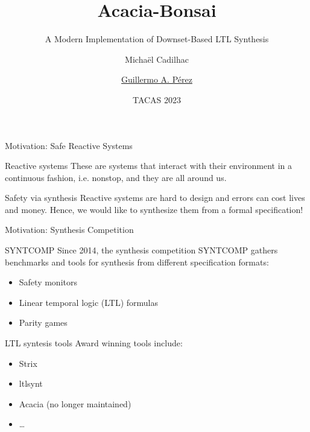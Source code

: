 \documentclass[aspectratio=169]{beamer}
\title{Acacia-Bonsai}
\subtitle{A Modern Implementation of Downset-Based LTL Synthesis}
\author{Micha\"el Cadilhac \and \underline{Guillermo A. P\'erez}}
\date{TACAS 2023}
\begin{document}
\begin{frame}
	\titlepage
\end{frame}

\begin{frame}{Motivation: Safe Reactive Systems}
  \begin{block}{Reactive systems}
    These are systems that interact with their environment in a
    \alert{continuous} fashion, i.e. nonstop, and they are all around us.
  \end{block}
  \begin{center}
  \end{center}
  \pause
  \begin{block}{Safety via synthesis}
    Reactive systems are hard to design and errors can \alert{cost lives} and
    money. Hence, we would like to \alert{synthesize them} from a formal
    specification!
  \end{block}
\end{frame}

\begin{frame}{Motivation: Synthesis Competition}
  \begin{block}{SYNTCOMP}
    Since 2014, the synthesis competition SYNTCOMP gathers benchmarks and
    tools for synthesis from different specification formats:
    \begin{itemize}
      \item Safety monitors
      \item \alert{Linear temporal logic (LTL) formulas}
      \item Parity games
    \end{itemize}
  \end{block}
  \pause
  \begin{block}{LTL syntesis tools}
    Award winning tools include:
    \begin{itemize}
      \item Strix
      \item ltlsynt
      \item \alert{Acacia (no longer maintained)}
      \item \dots
    \end{itemize}
  \end{block}
\end{frame}
\end{document}
